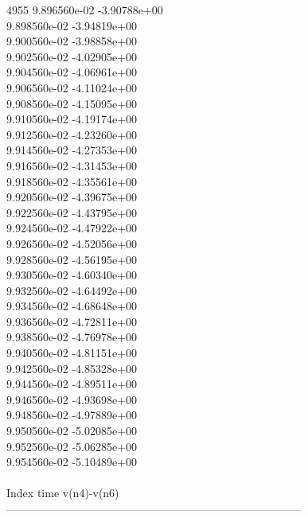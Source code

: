 4955	9.896560e-02	-3.90788e+00	\\ 	9.898560e-02	-3.94819e+00	\\ 	9.900560e-02	-3.98858e+00	\\ 	9.902560e-02	-4.02905e+00	\\ 	9.904560e-02	-4.06961e+00	\\ 	9.906560e-02	-4.11024e+00	\\ 	9.908560e-02	-4.15095e+00	\\ 	9.910560e-02	-4.19174e+00	\\ 	9.912560e-02	-4.23260e+00	\\ 	9.914560e-02	-4.27353e+00	\\ 	9.916560e-02	-4.31453e+00	\\ 	9.918560e-02	-4.35561e+00	\\ 	9.920560e-02	-4.39675e+00	\\ 	9.922560e-02	-4.43795e+00	\\ 	9.924560e-02	-4.47922e+00	\\ 	9.926560e-02	-4.52056e+00	\\ 	9.928560e-02	-4.56195e+00	\\ 	9.930560e-02	-4.60340e+00	\\ 	9.932560e-02	-4.64492e+00	\\ 	9.934560e-02	-4.68648e+00	\\ 	9.936560e-02	-4.72811e+00	\\ 	9.938560e-02	-4.76978e+00	\\ 	9.940560e-02	-4.81151e+00	\\ 	9.942560e-02	-4.85328e+00	\\ 	9.944560e-02	-4.89511e+00	\\ 	9.946560e-02	-4.93698e+00	\\ 	9.948560e-02	-4.97889e+00	\\ 	9.950560e-02	-5.02085e+00	\\ 	9.952560e-02	-5.06285e+00	\\ 	9.954560e-02	-5.10489e+00	\\ \hline
\\ \hline
Index   time            v(n4)-v(n6)     \\ \hline
--------------------------------------------------------------------------------\\ \hline
